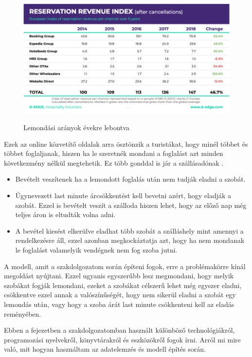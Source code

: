 \begin{figure}[h]
    \caption{Lemondási arányok évekre lebontva}
    \includegraphics[scale=0.45]{images/2.fejezet/Online_foglalas_lemondas_szazalek.png}
    \label{fig:lemondasi}
\end{figure}  
Ezek az online közvetítő oldalak arra ösztönzik a turistákat, hogy minél többet és többet foglaljanak, hiszen ha le szeretnék mondani a foglalást azt minden következmény nélkül megtehetik. Ez több gonddal is jár a szállásadónak \cite{online_lemondas}.
\begin{itemize}
    \item Bevételt veszítenek ha a lemondott foglalás után nem tudják eladni a szobát.
    \item Úgynevezett last minute árcsökkentést kell bevetni azért, hogy eladják a szobát. Ezzel is bevételt veszít a szálloda hiszen lehet, hogy az előző nap még teljes áron is eltudták volna adni.
    \item A bevétel kiesést elkerülve eladhat több szobát a szálláshely mint amennyi a rendelkezésre áll, ezzel azonban megkockáztatja azt, hogy ha nem mondanak le foglalást valamelyik vendégnek nem fog szoba jutni.
\end{itemize}

A modell, amit a szakdolgozatom során építeni fogok, erre a problémakörre kínál megoldást nyújtani. Ezzel ugyanis egyszerűbb lesz megmondani, hogy melyik szobákat fogják lemondani, ezeket a szobákat célszerű lehet még egyszer eladni, csökkentve ezzel annak a valószínűségét, hogy nem sikerül eladni a szobát egy lemondás után, vagy hogy a szoba árát last minute csökkenteni kell az eladás reményében.



Ebben a fejezetben a szakdolgozatomban használt különböző technológiákról, programozási nyelvekről, könyvtárakról és eszközökről fogok írni. Arról mi mire való, mit hogyan használtam az adatelemzés és modell építés során.

